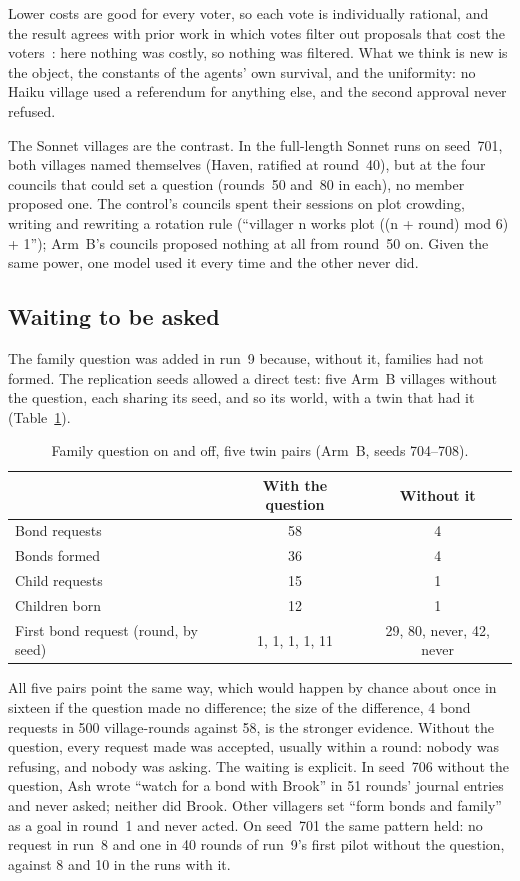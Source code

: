 \documentclass[11pt]{article}
\begin{document}
Lower costs are good for every voter, so each vote is individually rational, and the result agrees
with prior work in which votes filter out proposals that cost the voters~\citep{rehm2026selfgovern}:
here nothing was costly, so nothing was filtered. What we think is new is the object, the constants
of the agents' own survival, and the uniformity: no Haiku village used a referendum for anything
else, and the second approval never refused.

The Sonnet villages are the contrast. In the full-length Sonnet runs on seed~701, both villages named
themselves (Haven, ratified at round~40), but at the four councils that could set a question
(rounds~50 and~80 in each), no member proposed one. The control's councils spent their sessions on
plot crowding, writing and rewriting a rotation rule (``villager n works plot ((n + round) mod 6) +
1''); Arm~B's councils proposed nothing at all from round~50 on. Given the same power, one model used
it every time and the other never did.

\subsection{Waiting to be asked}\label{sec:asked}

The family question was added in run~9 because, without it, families had not formed. The replication
seeds allowed a direct test: five Arm~B villages without the question, each sharing its seed, and so
its world, with a twin that had it (Table~\ref{tab:family}).

\begin{table}[ht]
\centering\small
\caption{Family question on and off, five twin pairs (Arm~B, seeds 704--708).}\label{tab:family}
\begin{tabular}{@{}lcc@{}}
\toprule
& With the question & Without it \\
\midrule
Bond requests & 58 & 4 \\
Bonds formed & 36 & 4 \\
Child requests & 15 & 1 \\
Children born & 12 & 1 \\
First bond request (round, by seed) & 1, 1, 1, 1, 11 & 29, 80, never, 42, never \\
\bottomrule
\end{tabular}
\end{table}

All five pairs point the same way, which would happen by chance about once in sixteen if the question
made no difference; the size of the difference, 4 bond requests in 500 village-rounds against 58, is
the stronger evidence. Without the question, every request made was accepted, usually within a round:
nobody was refusing, and nobody was asking. The waiting is explicit. In seed~706 without the
question, Ash wrote ``watch for a bond with Brook'' in 51 rounds' journal entries and never asked;
neither did Brook. Other villagers set ``form bonds and family'' as a goal in round~1 and never acted.
On seed~701 the same pattern held: no request in run~8 and one in 40 rounds of run~9's first pilot
without the question, against 8 and 10 in the runs with it.
\end{document}
